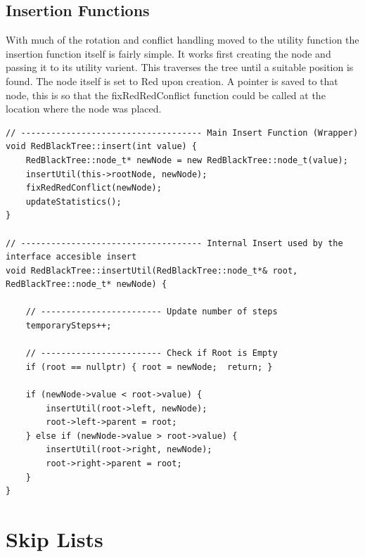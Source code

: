 \documentclass[12pt, a4paper]{report}
\begin{document}
\section{Insertion Functions}
With much of the rotation and conflict handling moved to the utility function the insertion function itself is fairly simple. It works first creating the node and passing it to its utility varient. This traverses the tree until a suitable position is found. The node itself is set to Red upon creation. A pointer is saved to that node, this is so that the fixRedRedConflict function could be called at the location where the node was placed.
\begin{verbatim}
// ------------------------------------ Main Insert Function (Wrapper)
void RedBlackTree::insert(int value) {
    RedBlackTree::node_t* newNode = new RedBlackTree::node_t(value);
    insertUtil(this->rootNode, newNode);
    fixRedRedConflict(newNode);
    updateStatistics();
}

// ------------------------------------ Internal Insert used by the interface accesible insert
void RedBlackTree::insertUtil(RedBlackTree::node_t*& root, RedBlackTree::node_t* newNode) {
    
    // ------------------------ Update number of steps
    temporarySteps++;

    // ------------------------ Check if Root is Empty
    if (root == nullptr) { root = newNode;  return; }

    if (newNode->value < root->value) {
        insertUtil(root->left, newNode);
        root->left->parent = root;
    } else if (newNode->value > root->value) {
        insertUtil(root->right, newNode);
        root->right->parent = root;
    }
}
\end{verbatim}

\chapter{Skip Lists}
\end{document}
